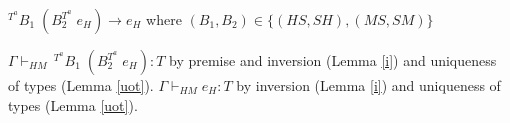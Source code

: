 \begin{case}
$^{T^{a}}B_{1}\;(B_{2}^{T^{a}}\;e_{H})\rightarrow e_{H}$ where $(B_{1},B_{2})\in\lbrace(HS,SH),(MS,SM)\rbrace$

$\Gamma\vdash_{HM}\,^{T^{a}}B_{1}\;(B_{2}^{T^{a}}\;e_{H}):T$ by premise and inversion (Lemma \ref{i}) and uniqueness of types (Lemma \ref{uot}).  $\Gamma\vdash_{HM}e_{H}:T$ by inversion (Lemma \ref{i}) and uniqueness of types (Lemma \ref{uot}).
\end{case}